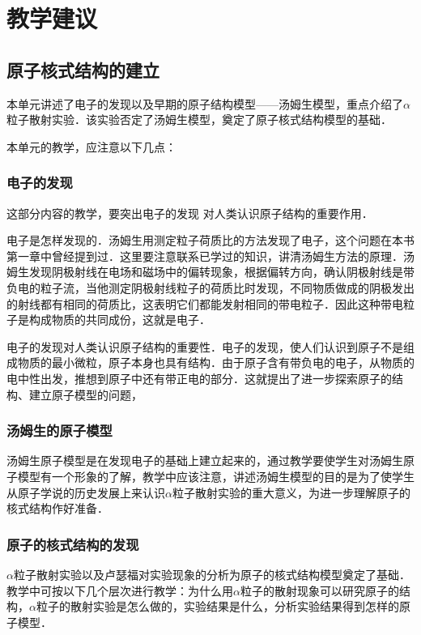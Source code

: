 \section{教学建议}
\subsection{原子核式结构的建立}
本单元讲述了电子的发现以及早期的原子结构模型——汤姆生模型，重点介绍了$\alpha$粒子散射实验．该实验否定了汤姆生模型，奠定了原子核式结构模型的基础．

本单元的教学，应注意以下几点：

\subsubsection{电子的发现}

这部分内容的教学，要突出电子的发现
对人类认识原子结构的重要作用．

电子是怎样发现的．汤姆生用测定粒子荷质比的方法发现了电子，这个问题在本书第一章中曾经提到过．这里要注意联系已学过的知识，讲清汤姆生方法的原理．汤姆生发现阴极射线在电场和磁场中的偏转现象，根据偏转方向，确认阴极射线是带负电的粒子流，当他测定阴极射线粒子的荷质比时发现，不同物质做成的阴极发出的射线都有相同的荷质比，这表明它们都能发射相同的带电粒子．因此这种带电粒子是构成物质的共同成份，这就是电子．

电子的发现对人类认识原子结构的重要性．电子的发现，使人们认识到原子不是组成物质的最小微粒，原子本身也具有结构．由于原子含有带负电的电子，从物质的电中性出发，推想到原子中还有带正电的部分．这就提出了进一步探索原子的结构、建立原子模型的问题，

\subsubsection{汤姆生的原子模型}

汤姆生原子模型是在发现电子的基础上建立起来的，通过教学要使学生对汤姆生原子模型有一个形象的了解，教学中应该注意，讲述汤姆生模型的目的是为了使学生从原子学说的历史发展上来认识$\alpha$粒子散射实验的重大意义，为进一步理解原子的核式结构作好准备．

\subsubsection{原子的核式结构的发现}

$\alpha$粒子散射实验以及卢瑟福对实验现象的分析为原子的核式结构模型奠定了基础．教学中可按以下几个层次进行教学：为什么用$\alpha$粒子的散射现象可以研究原子的结构，$\alpha$粒子的散射实验是怎么做的，实验结果是什么，分析实验结果得到怎样的原子模型．


